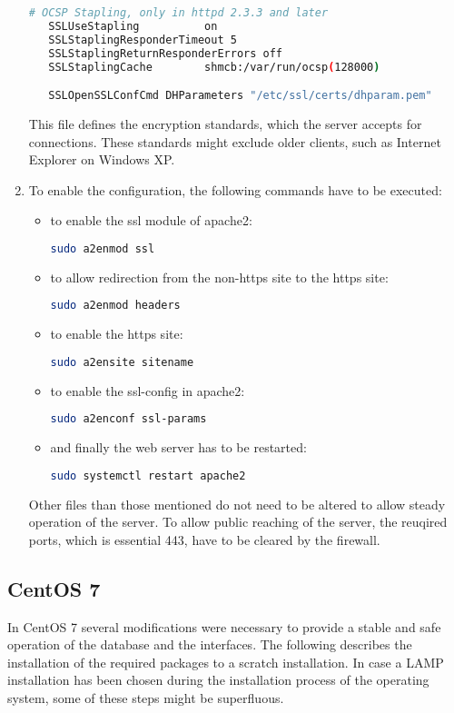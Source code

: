 \begin{enumerate}
\begin{lstlisting}[language=bash]
   # OCSP Stapling, only in httpd 2.3.3 and later
   SSLUseStapling          on
   SSLStaplingResponderTimeout 5
   SSLStaplingReturnResponderErrors off
   SSLStaplingCache        shmcb:/var/run/ocsp(128000)

   SSLOpenSSLConfCmd DHParameters "/etc/ssl/certs/dhparam.pem"
  \end{lstlisting}
  This file defines the encryption standards, which the server accepts for connections. These standards might exclude older clients, such as Internet Explorer on Windows XP.
  \item To enable the configuration, the following commands have to be executed:
  \begin{itemize}
  \item to enable the ssl module of apache2:
  \begin{lstlisting}[language=bash]
   sudo a2enmod ssl
  \end{lstlisting}
  \item to allow redirection from the non-https site to the https site:
  \begin{lstlisting}[language=bash]
   sudo a2enmod headers
  \end{lstlisting}
  \item to enable the https site:
  \begin{lstlisting}[language=bash]
   sudo a2ensite sitename
  \end{lstlisting}
  \item to enable the ssl-config in apache2:
  \begin{lstlisting}[language=bash]
   sudo a2enconf ssl-params
  \end{lstlisting}
  \item and finally the web server has to be restarted:
  \begin{lstlisting}[language=bash]
   sudo systemctl restart apache2
  \end{lstlisting}
  \end{itemize}
  Other files than those mentioned do not need to be altered to allow steady operation of the server. To allow public reaching of the server, the reuqired ports, 
  which is essential 443, have to be cleared by the firewall.
\end{enumerate}

\subsection{CentOS 7}
In CentOS 7 several modifications were necessary to provide a stable and safe operation of the database and the interfaces. The following describes the installation of the required
packages to a scratch installation. In case a LAMP installation has been chosen during the installation process of the operating system, some of these steps might be superfluous. 
